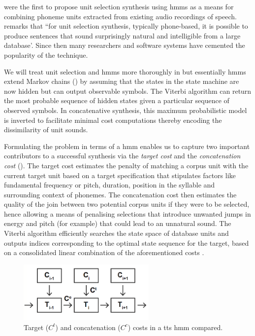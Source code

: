 \cite{Hunt1996} were the first to propose unit selection synthesis using \acrfull{hmm}s as a means for combining phoneme units extracted from existing audio recordings of speech. \cite{Conkie1999} remarks that ``for unit selection synthesis, typically phone-based, it is possible to produce sentences that sound surprisingly natural and intelligible from a large database'. Since then many researchers \citep{Conkie1999, balestri1999choose, schroder2001emotional, Tihelka2010, Lakkavalli2010} and software systems \citep{black1994chatr, beutnagel1999t, Young2002} have cemented the popularity of the technique.

We will treat unit selection and \acrshort{hmm}s more thoroughly in  but essentially \acrshort{hmm}s extend Markov chains () by assuming that the states in the state machine are now hidden but can output observable symbols. The Viterbi algorithm can return the most probable sequence of hidden states given a particular sequence of observed symbols. In concatenative synthesis, this maximum probabilistic model is inverted to facilitate minimal cost computations thereby encoding the dissimilarity of unit sounds.

Formulating the problem in terms of a \acrshort{hmm} enables us to capture two important contributors to a successful synthesis via the \textit{target cost} and the \textit{concatenation cost} (). The target cost estimates the penalty of matching a corpus unit with the current target unit based on a target specification that stipulates factors like fundamental frequency or pitch, duration, position in the syllable and surrounding context of phonemes. The concatenation cost then estimates the quality of the join between two potential corpus units if they were to be selected, hence allowing a means of penalising selections that introduce unwanted jumps in energy and pitch (for example) that could lead to an unnatural sound. The Viterbi algorithm efficiently searches the state space of database units and outputs indices corresponding to the optimal state sequence for the target, based on a consolidated linear combination of the aforementioned costs \citep{Ob1995, Hunt1996}.

\begin{figure}
	\begin{center}
		\includegraphics[width=0.6\textwidth]{ch04_sota/figures/costs.png}
	\end{center}
	\caption[Target  and concatenation costs in a text-to-speech Hidden Markov Model compared]{Target ($C^{t}$) and concatenation ($C^{c}$) costs in a \acrshort{tts} \acrshort{hmm} compared.}
	\label{fig:target_concat_costs}
\end{figure}

